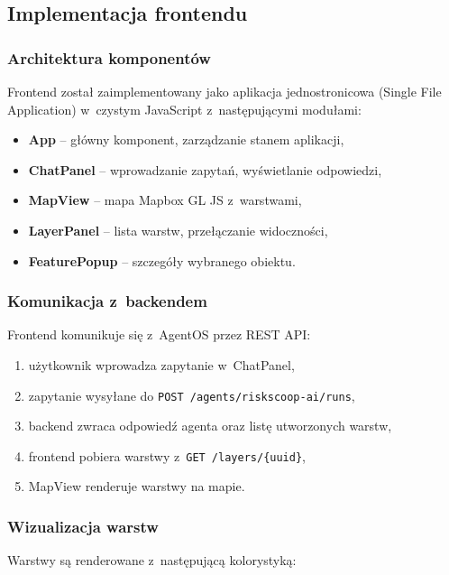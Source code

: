 \subsection{Implementacja frontendu}

\subsubsection{Architektura komponentów}

Frontend został zaimplementowany jako aplikacja jednostronicowa (Single File Application) w~czystym JavaScript z~następującymi modułami:

\begin{itemize}
    \item \textbf{App} -- główny komponent, zarządzanie stanem aplikacji,
    \item \textbf{ChatPanel} -- wprowadzanie zapytań, wyświetlanie odpowiedzi,
    \item \textbf{MapView} -- mapa Mapbox GL JS z~warstwami,
    \item \textbf{LayerPanel} -- lista warstw, przełączanie widoczności,
    \item \textbf{FeaturePopup} -- szczegóły wybranego obiektu.
\end{itemize}

\subsubsection{Komunikacja z~backendem}

Frontend komunikuje się z~AgentOS przez REST API:

\begin{enumerate}
    \item użytkownik wprowadza zapytanie w~ChatPanel,
    \item zapytanie wysyłane do \texttt{POST /agents/riskscoop-ai/runs},
    \item backend zwraca odpowiedź agenta oraz listę utworzonych warstw,
    \item frontend pobiera warstwy z~\texttt{GET /layers/\{uuid\}},
    \item MapView renderuje warstwy na mapie.
\end{enumerate}

\subsubsection{Wizualizacja warstw}

Warstwy są renderowane z~następującą kolorystyką:

